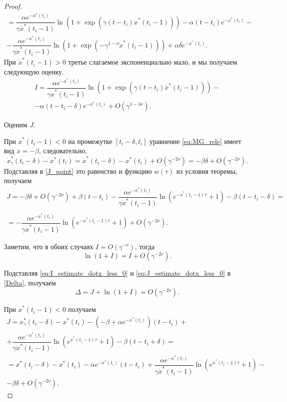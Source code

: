 \begin{proof}
\begin{multline}
	= \dfrac{\alpha e^{-x^*(t_i)}}{\gamma \dot{x}^*(t_i - 1)}\ln\left(1 + \exp(\gamma(t - t_i)\dot{x}^*(t_i - 1))\right) - \alpha (t - t_i) e^{-x^*(t_i)} -\\- \dfrac{\alpha e^{-x^*(t_i)}}{\gamma \dot{x}^*(t_i - 1)}\ln\left(1 + \exp(-\gamma^{1 - \nu}\dot{x}^*(t_i - 1))\right) + \alpha \delta e^{-x^*(t_i)}. 
	\end{multline}
	При $\dot{x}^*(t_i - 1) > 0$ третье слагаемое экспоненциально мало, и мы получаем следующую оценку.
	\begin{multline}
		\label{eq:I_estimate_dotx_greater_0}
		I = \dfrac{\alpha e^{-x^*(t_i)}}{\gamma \dot{x}^*(t_i - 1)}\ln\left(1 + \exp(\gamma(t - t_i)\dot{x}^*(t_i - 1))\right) -\\- \alpha (t - t_i - \delta) e^{-x^*(t_i)} + O(\gamma^{1 - 3\nu}).
	\end{multline}
	
	Оценим $J$.
	
	При $\dot{x}^*(t_i - 1) < 0$ на промежутке $[t_i - \delta, t_i]$ уравнение \eqref{eq:MG_rele} имеет вид $\dot{x} = -\beta$, следовательно, 
	\[
	\dot{x}_{\gamma}^*(t_i - \delta) - x^*(t_i) = \dot{x}^*(t_i - \delta) - x^*(t_i) + O(\gamma^{-2\nu}) = -\beta \delta + O(\gamma^{-2\nu}).
	\]
	Подставляя в \eqref{J_point} это равенство и функцию $w(\tau)$ из условия теоремы, получаем
	\begin{multline}
		\label{eq:J_estimate_dotx_less_0}
	J = -\beta \delta + O(\gamma^{-2\nu}) + \beta (t - t_i) - \dfrac{\alpha e^{-x^*(t_i)}}{\gamma \dot{x}^*(t_i - 1)} \ln\left(e^{-\dot{x}^*(t_i - 1)\tau} + 1\right) - \beta(t - t_i - \delta) =\\
	\\= -\dfrac{\alpha e^{-x^*(t_i)}}{\gamma \dot{x}^*(t_i - 1)} \ln\left(e^{-\dot{x}^*(t_i - 1)\tau} + 1\right) + O(\gamma^{-2\nu}).
	\end{multline}
	
	Заметим, что в обоих случаях $I = O(\gamma^{-\nu})$, тогда 
	\begin{equation}
	\label{eq:ln_1_plus_I}
	\ln(1 + I) = I + O(\gamma^{-2\nu}).
	\end{equation}
	
	Подставляя \eqref{eq:I_estimate_dotx_less_0} и \eqref{eq:J_estimate_dotx_less_0} в \eqref{Delta}, получаем
	\[
	\Delta = J + \ln(1 + I) = O(\gamma^{-2\nu}).
	\]
	
	При $\dot{x}^*(t_i - 1) < 0$ получаем
	\begin{multline}
	\label{eq:J_estimate_dotx_greater_0}
	J = x_{\gamma}^*(t_i - \delta) - x^*(t_i) - (-\beta + \alpha e^{-x^*(t_i)})(t - t_i) +\\+ \dfrac{\alpha e^{-x^*(t_i)}}{\gamma \dot{x}^*(t_i - 1)} \ln\left(e^{\dot{x}^*(t_i - 1)\tau} + 1\right) - \beta(t - t_i + \delta) =\\
	= x^*(t_i - \delta) - x^*(t_i) - \alpha e^{-x^*(t_i)}(t - t_i) + \dfrac{\alpha e^{-x^*(t_i)}}{\gamma \dot{x}^*(t_i - 1)} \ln\left(e^{\dot{x}^*(t_i - 1)\tau} + 1\right) -\\- \beta\delta + O(\gamma^{-2\nu}).
	\end{multline}
	

\end{proof}
